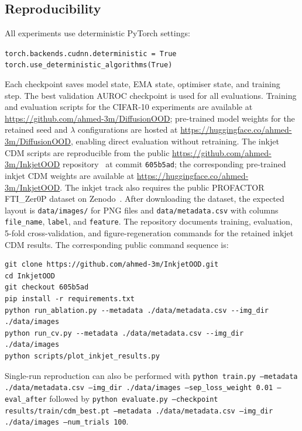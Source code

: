 \subsection{Reproducibility}
\label{sec:exp:protocol:reproducibility}

All experiments use deterministic PyTorch settings:

\medskip
\noindent
\texttt{torch.backends.cudnn.deterministic = True}\\
\texttt{torch.use\_deterministic\_algorithms(True)}

\medskip
Each checkpoint saves model state, EMA state, optimiser state, and
training step. The best validation AUROC checkpoint is used for all
evaluations. Training and evaluation scripts for the CIFAR-10 experiments are
available at \url{https://github.com/ahmed-3m/DiffusionOOD}; pre-trained
model weights for the retained seed and $\lambda$ configurations are hosted at
\url{https://huggingface.co/ahmed-3m/DiffusionOOD}, enabling direct
evaluation without retraining. The inkjet CDM scripts are reproducible
from the public \url{https://github.com/ahmed-3m/InkjetOOD}
repository~\cite{mohammed2026inkjetood} at commit \texttt{605b5ad};
the corresponding pre-trained inkjet CDM weights are available at
\url{https://huggingface.co/ahmed-3m/InkjetOOD}. The inkjet track also
requires the public PROFACTOR FTI\_Zer0P dataset on
Zenodo~\citep{profactor2024fti}. After downloading the dataset, the
expected layout is \texttt{data/images/} for PNG files and
\texttt{data/metadata.csv} with columns \texttt{file\_name},
\texttt{label}, and \texttt{feature}. The repository documents
training, evaluation, 5-fold cross-validation, and figure-regeneration
commands for the retained inkjet CDM results.
The corresponding public command sequence is:

\begin{verbatim}
git clone https://github.com/ahmed-3m/InkjetOOD.git
cd InkjetOOD
git checkout 605b5ad
pip install -r requirements.txt
python run_ablation.py --metadata ./data/metadata.csv --img_dir ./data/images
python run_cv.py --metadata ./data/metadata.csv --img_dir ./data/images
python scripts/plot_inkjet_results.py
\end{verbatim}

Single-run reproduction can also be performed with
\texttt{python train.py --metadata ./data/metadata.csv --img\_dir
./data/images --sep\_loss\_weight 0.01 --eval\_after} followed by
\texttt{python evaluate.py --checkpoint results/train/cdm\_best.pt
--metadata ./data/metadata.csv --img\_dir ./data/images --num\_trials
100}.

